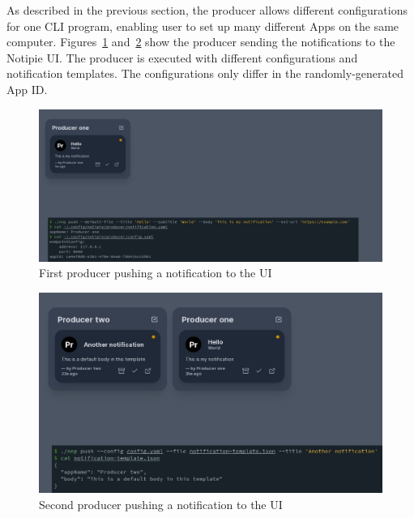 As described in the previous section,
the producer allows different configurations
for one \ac{CLI} program,
enabling user to set up many different Apps
on the same computer.
Figures~\ref{fig:notipie-one-notification}
and~\ref{fig:notipie-two-notifications}
show the producer sending the notifications
to the Notipie \ac{UI}.
The producer is executed
with different configurations
and notification templates.
The configurations only differ
in the randomly-generated App \ac{ID}.

\begin{figure}[p]
  \centering
  \includegraphics[width=\linewidth,keepaspectratio]{img/notipie_one_notification.jpg}
  \caption{First producer pushing a notification to the UI}
  \label{fig:notipie-one-notification}
\end{figure}

\begin{figure}[p]
  \centering
  \includegraphics[width=\linewidth,keepaspectratio]{img/notipie_two_notifications.jpg}
  \caption{Second producer pushing a notification to the UI}
  \label{fig:notipie-two-notifications}
\end{figure}
